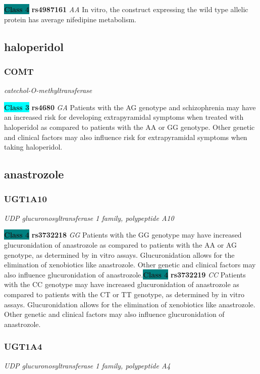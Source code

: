 \documentclass{report}
\begin{document}
\textbf{\colorbox{teal} {Class 4}} \textbf{ rs4987161 } \textit{ AA }
In vitro, the construct expressing the wild type allelic protein has average nifedipine metabolism.\newline\subsection{ haloperidol }\subsubsection{ COMT }
\textit{ catechol-O-methyltransferase }

\textbf{\colorbox{cyan} {Class 3}} \textbf{ rs4680 } \textit{ GA }
Patients with the AG genotype and schizophrenia may have an increased risk for developing extrapyramidal symptoms when treated with haloperidol as compared to patients with the AA or GG genotype. Other genetic and clinical factors may also influence risk for extrapyramidal symptoms when taking haloperidol.\newline\subsection{ anastrozole }\subsubsection{ UGT1A10 }
\textit{ UDP glucuronosyltransferase 1 family, polypeptide A10 }

\textbf{\colorbox{teal} {Class 4}} \textbf{ rs3732218 } \textit{ GG }
Patients with the GG genotype may have increased glucuronidation of anastrozole as compared to patients with the AA or AG genotype, as determined by in vitro assays. Glucuronidation allows for the elimination of xenobiotics like anastrozole. Other genetic and clinical factors may also influence glucuronidation of anastrozole.\newline\textbf{\colorbox{teal} {Class 4}} \textbf{ rs3732219 } \textit{ CC }
Patients with the CC genotype may have increased glucuronidation of anastrozole as compared to patients with the CT or TT genotype, as determined by in vitro assays. Glucuronidation allows for the elimination of xenobiotics like anastrozole. Other genetic and clinical factors may also influence glucuronidation of anastrozole. \newline\subsubsection{ UGT1A4 }
\textit{ UDP glucuronosyltransferase 1 family, polypeptide A4 }
\end{document}
